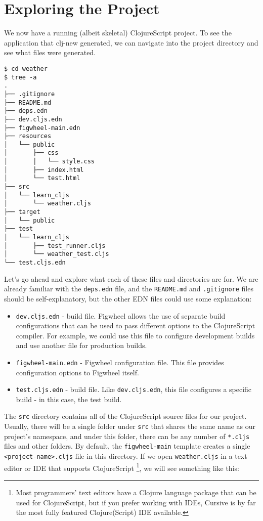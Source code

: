 \documentclass[10pt,twoside,openright]{memoir}
\begin{document}
\section{Exploring the Project}

We now have a running (albeit skeletal) ClojureScript project. To see
the application that clj-new generated, we can navigate into the project
directory and see what files were generated.

\clearpage
\begin{verbatim}
$ cd weather
$ tree -a
.
├── .gitignore
├── README.md
├── deps.edn
├── dev.cljs.edn
├── figwheel-main.edn
├── resources
│   └── public
│       ├── css
│       │   └── style.css
│       ├── index.html
│       └── test.html
├── src
│   └── learn_cljs
│       └── weather.cljs
├── target
│   └── public
├── test
│   └── learn_cljs
│       ├── test_runner.cljs
│       └── weather_test.cljs
└── test.cljs.edn
\end{verbatim}

Let's go ahead and explore what each of these files and directories are
for. We are already familiar with the \texttt{deps.edn} file, and the
\texttt{README.md} and \texttt{.gitignore} files should be
self-explanatory, but the other EDN files could use some explanation:

\begin{itemize}
\tightlist
\item
  \texttt{dev.cljs.edn} - build file. Figwheel allows the use of
  separate build configurations that can be used to pass different
  options to the ClojureScript compiler. For example, we could use this
  file to configure development builds and use another file for
  production builds.
\item
  \texttt{figwheel-main.edn} - Figwheel configuration file. This file
  provides configuration options to Figwheel itself.
\item
  \texttt{test.cljs.edn} - build file. Like \texttt{dev.cljs.edn}, this
  file configures a specific build - in this case, the test build.
\end{itemize}

The \texttt{src} directory contains all of the ClojureScript source
files for our project. Usually, there will be a single folder under
\texttt{src} that shares the same name as our project's namespace, and
under this folder, there can be any number of \texttt{*.cljs} files and
other folders. By default, the \texttt{figwheel-main} template creates a
single \texttt{\textless{}project-name\textgreater{}.cljs} file in this
directory. If we open \texttt{weather.cljs} in a text editor or IDE that
supports ClojureScript \footnote{Most programmers' text editors have a
  Clojure language package that can be used for ClojureScript, but if
  you prefer working with IDEs, Cursive is by far the most fully
  featured Clojure(Script) IDE available.}, we will see something like
this:
\end{document}
